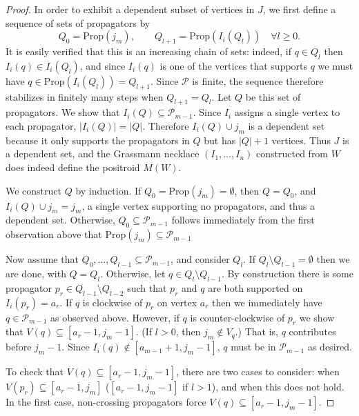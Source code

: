 \documentclass[11pt]{article}
\newcommand{\cP}{\mathcal{P}}
\newcommand{\Prop}{\textrm{Prop}}
\theoremstyle{remark}
\theoremstyle{definition}
\begin{document}
\begin{proof}

In order to exhibit a dependent subset of vertices in $J$, we first define a sequence of sets of propagators by
\[Q_0 = \Prop(j_m), \qquad Q_{l+1} = \Prop(I_i(Q_l))\quad \forall l \geq 0.\]
It is easily verified that this is an increasing chain of sets: indeed, if $q \in Q_l$ then $I_i(q) \in I_i(Q_l)$, and since $I_i(q)$ is one of the vertices that supports $q$ we must have $q \in \Prop(I_i(Q_l)) = Q_{l+1}$. Since $\cP$ is finite, the sequence therefore stabilizes in finitely many steps when $Q_{l+1} = Q_l$. Let $Q$ be this set of propagators. We show that $I_i(Q) \subseteq \mathcal{P}_{m-1}$. Since $I_i$ assigns a single vertex to each propagator, $|I_i(Q)| = |Q|$. Therefore $I_i(Q) \cup {j_m}$ is a dependent set because it only supports the propagators in $Q$ but has $|Q|+1$ vertices. Thus $J$ is a dependent set, and the Grassmann necklace $(I_1,\dots,I_n)$ constructed from $W$ does indeed define the positroid $M(W)$.

We construct $Q$ by induction.  If $Q_0 = \Prop(j_m) = \emptyset$, then $Q = Q_0$, and $I_i(Q) \cup {j_m}= j_m$, a single vertex supporting no propagators, and thus a dependent set. Otherwise, $Q_0 \subseteq \cP_{m-1}$ follows immediately from the first observation above that $\Prop(j_m) \subseteq \cP_{m-1}$

Now assume that $Q_0,\dots,Q_{l-1} \subseteq \cP_{m-1}$, and consider $Q_{l}$. If $Q_{l} \setminus Q_{l-1} = \emptyset$ then we are done, with $Q = Q_l$.  Otherwise, let $q \in Q_{l} \setminus Q_{l-1}$. By construction there is some propagator $p_r \in Q_{l-1}\setminus Q_{l-2}$ such that $p_r$ and $q$ are both supported on $I_i(p_r) = a_r$. If $q$ is clockwise of $p_r$ on vertex $a_r$ then we immediately have $q \in \cP_{m-1}$ as observed above. However, if $q$ is counter-clockwise of $p_r$  we show that $V(q) \subseteq [a_r-1, j_m-1]$. (If $l>0$, then $j_m \not \in V_q$.) That is, $q$ contributes before $j_m-1$. Since $I_i(q) \not \in [a_{m-1}+1, j_m-1]$, $q$ must be in $\cP_{m-1}$ as desired. 

To check that $V(q) \subseteq [a_r-1, j_m-1]$, there are two cases to consider: when $V(p_r) \subseteq [a_r-1, j_m]$ ($[a_r-1, j_m-1]$ if $l >1$), and when this does not hold. In the first case, non-crossing propagators force $V(q) \subseteq [a_r-1, j_m-1]$. 


\end{proof}
\end{document}
